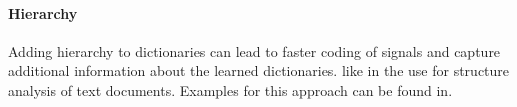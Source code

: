 \paragraph{Hierarchy}
Adding hierarchy to dictionaries can lead to faster coding of signals and
capture additional information about the learned dictionaries. like in the use
for structure analysis of text documents. Examples for this approach can be
found in\cite{Jenatton2010}.






